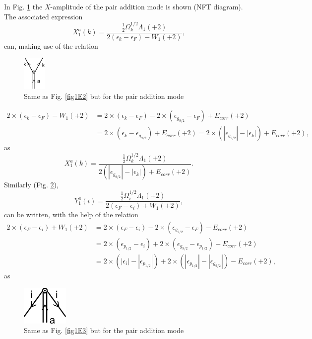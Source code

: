 In Fig. \ref{fig1E4} the $X$-amplitude of the pair addition mode is shown (NFT diagram). The associated expression
\begin{equation*}
X_1^a(k)=\frac{\frac{1}{2}\Omega_k^{1/2}\Lambda_1(+2)}{2(\epsilon_k-\epsilon_F)-W_1(+2)},
\end{equation*}
can, making use of the relation
  \begin{figure}
  \centerline{\includegraphics*[width=0.1\textwidth,angle=0]{nutshell/figs/addition_forward.pdf}}
  \caption{Same as Fig. \ref{fig1E2} but for the pair addition mode}\label{fig1E4}
  \end{figure}
  
\begin{equation*}
\begin{split}
2\times(\epsilon_k-\epsilon_F)-W_1(+2)&=2\times(\epsilon_k-\epsilon_F)-2\times(\epsilon_{g_{9/2}}-\epsilon_F)+E_{corr}(+2)\\
&=2\times(\epsilon_k-\epsilon_{g_{9/2}})+E_{corr}(+2)=2\times(|\epsilon_{g_{9/2}}|-|\epsilon_k|)+E_{corr}(+2),
\end{split}
\end{equation*}
as
\begin{equation*}
X_1^a(k)=\frac{\frac{1}{2}\Omega_k^{1/2}\Lambda_1(+2)}{2(|\epsilon_{g_{9/2}}|-|\epsilon_k|)+E_{corr}(+2)}.
\end{equation*}
Similarly (Fig. \ref{fig1E5}),
\begin{equation*}
Y_1^a(i)=\frac{\frac{1}{2}\Omega_i^{1/2}\Lambda_1(+2)}{2(\epsilon_F-\epsilon_i)+W_1(+2)},
\end{equation*}
can be written, with the help of the relation
\begin{equation*}
\begin{split}
2\times(\epsilon_F-\epsilon_i)+W_1(+2)&=2\times(\epsilon_F-\epsilon_i)-2\times(\epsilon_{g_{9/2}}-\epsilon_F)-E_{corr}(+2)\\
&=2\times(\epsilon_{p_{1/2}}-\epsilon_i)+2\times(\epsilon_{g_{9/2}}-\epsilon_{p_{1/2}})-E_{corr}(+2)\\
&=2\times(|\epsilon_i|-|\epsilon_{p_{1/2}}|)+2\times(|\epsilon_{p_{1/2}}|-|\epsilon_{g_{9/2}}|)-E_{corr}(+2),
\end{split}
\end{equation*}
as
  \begin{figure}
  \centerline{\includegraphics*[width=0.2\textwidth,angle=0]{nutshell/figs/addition_backward.pdf}}
  \caption{Same as Fig. \ref{fig1E3} but for the pair addition mode}\label{fig1E5}
  \end{figure}

